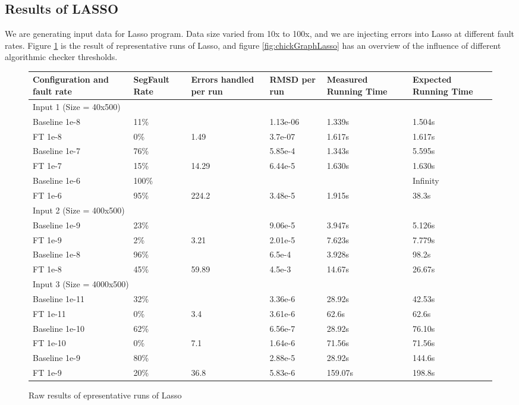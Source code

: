 \documentclass{article}
\begin{document}
\subsection{Results of LASSO}

We are generating input data for Lasso program. Data size varied from 10x to 100x, and we are injecting errors into Lasso at different fault rates. Figure \ref{fig:lassoTable} is the result of representative runs of Lasso, and figure \ref{fig:chickGraphLasso} has an overview of the influence of different algorithmic checker thresholds.

\begin{figure} \begin{center} \begin{tabular}{p{2.5cm}p{2cm}p{2cm}p{2cm}p{2.5cm}p{2.5cm}}
\hline
Configuration and fault rate & SegFault Rate & Errors handled per run & RMSD per run & Measured Running Time & Expected Running Time \\
\hline
\multicolumn{6}{l}{Input 1 (Size = 40x500)} \\
Baseline 1e-8 & 11\%  &         & 1.13e-06 & 1.339s & 1.504s \\
FT 1e-8       & 0\%   & 1.49    & 3.7e-07  & 1.617s & 1.617s \\
Baseline 1e-7 & 76\%  &         & 5.85e-4  & 1.343s & 5.595s \\
FT 1e-7       & 15\%  & 14.29   & 6.44e-5  & 1.630s & 1.630s \\
Baseline 1e-6 & 100\% &         &          &        & Infinity \\
FT 1e-6       & 95\%  & 224.2   & 3.48e-5  & 1.915s & 38.3s  \\
\hline
\multicolumn{6}{l}{Input 2 (Size = 400x500)} \\
Baseline 1e-9 & 23\%  &         & 9.06e-5  & 3.947s & 5.126s \\
FT 1e-9       & 2\%   & 3.21    & 2.01e-5  & 7.623s & 7.779s \\
Baseline 1e-8 & 96\%  &         & 6.5e-4   & 3.928s & 98.2s  \\
FT 1e-8       & 45\%  & 59.89   & 4.5e-3   & 14.67s & 26.67s \\
\hline
\multicolumn{6}{l}{Input 3 (Size = 4000x500)} \\
Baseline 1e-11 & 32\% &         & 3.36e-6  & 28.92s & 42.53s \\
FT 1e-11      & 0\%   & 3.4     & 3.61e-6  & 62.6s  & 62.6s  \\
Baseline 1e-10 & 62\% &         & 6.56e-7  & 28.92s & 76.10s \\
FT 1e-10      & 0\%   & 7.1     & 1.64e-6  & 71.56s & 71.56s \\
Baseline 1e-9 & 80\%  &         & 2.88e-5  & 28.92s & 144.6s \\
FT 1e-9       & 20\%  & 36.8    & 5.83e-6  & 159.07s& 198.8s \\
\hline

\end{tabular}
\caption{Raw results of epresentative runs of Lasso}
\label{fig:lassoTable}
\end{center}
\end{figure}
\end{document}
